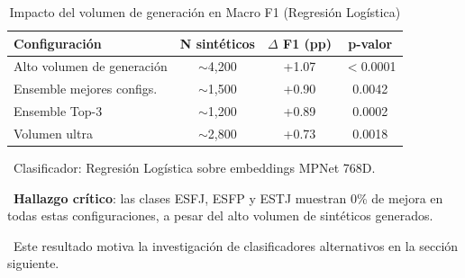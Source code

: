 \begin{table}[htbp]
\centering
\caption{Impacto del volumen de generación en Macro F1 (Regresión Logística)}
\label{tab:volumen_ensembles}
\begin{tabular}{lccc}
\toprule
\textbf{Configuración} & \textbf{N sintéticos} & \textbf{$\Delta$ F1 (pp)} & \textbf{p-valor} \\
\midrule
Alto volumen de generación & $\sim$4,200 & +1.07 & $<$0.0001 \\
Ensemble mejores configs. & $\sim$1,500 & +0.90 & 0.0042 \\
Ensemble Top-3 & $\sim$1,200 & +0.89 & 0.0002 \\
Volumen ultra & $\sim$2,800 & +0.73 & 0.0018 \\
\bottomrule
\end{tabular}
\vspace{0.5em}\footnotesize

\textbullet\ Clasificador: Regresión Logística sobre embeddings MPNet 768D.

\textbullet\ \textbf{Hallazgo crítico}: las clases ESFJ, ESFP y ESTJ muestran 0\% de mejora en todas estas configuraciones, a pesar del alto volumen de sintéticos generados.

\textbullet\ Este resultado motiva la investigación de clasificadores alternativos en la sección siguiente.

\end{table}
